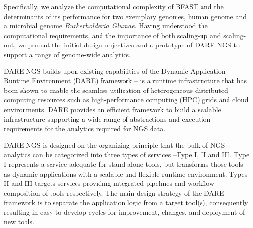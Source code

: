 \documentclass{cpeauth}
\begin{document}

Specifically, we analyze the computational complexity of
BFAST\cite{bfast2009, bfast2009b} and the determinants of its
performance for two exemplary genomes, human genome and a microbial
genome {\it Burkerholderia Glumae}\cite{kim2011}.  Having understood
the computational requirements, and the importance of both scaling-up
and scaling-out, we present the initial design objectives and a
prototype of DARE-NGS to support a range of genome-wide analytics.
 
DARE-NGS builds upon existing capabilities of the Dynamic Application
Runtime Environment (DARE) framework\cite{dare-tg11} -- is a runtime
infrastructure that has been shown to enable the seamless utilization
of heterogeneous distributed computing
resources\cite{jha2009developing,saga-royalsoc,saga-ccgrid10} such as
high-performance computing (HPC) grids and cloud environments.  DARE
provides an efficient framework to build a scalable infrastructure supporting a wide range of abstractions and
execution requirements for the analytics required for NGS data.

DARE-NGS is designed on the organizing principle that the bulk of
NGS-analytics can be categorized into three types of services --Type
I, II and III. Type I represents a service adequate for stand-alone tools, but transforms those tools
as dynamic applications with a scalable and flexible runtime environment. Types II and III
targets services providing integrated pipelines and workflow composition of tools
respectively.  The main design strategy of the DARE framework is to
separate the application logic from a target tool(s), consequently
resulting in easy-to-develop cycles for improvement, changes, and
deployment of new tools.
\end{document}
